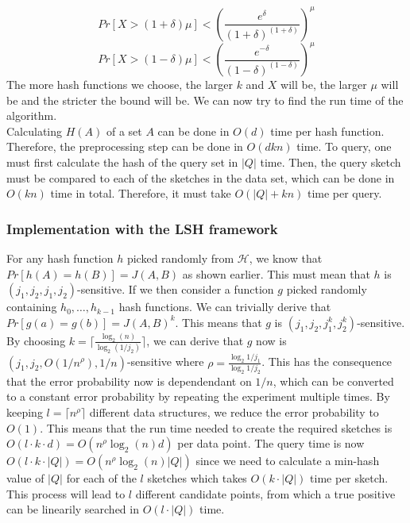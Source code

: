 $$Pr[X > (1+\delta)\mu] < \left(\frac{e^\delta}{(1+\delta)^{(1+\delta)}}\right)^\mu$$
$$Pr[X > (1-\delta)\mu] < \left(\frac{e^{-\delta}}{(1-\delta)^{(1-\delta)}}\right)^\mu$$
The more hash functions we choose, the larger $k$ and $X$ will be, the larger $\mu$ will be and the stricter the bound will be. We can now try to find the run time of the algorithm.\\
Calculating $H(A)$ of a set $A$ can be done in $O(d)$ time per hash function. Therefore, the preprocessing step can be done in $O(dkn)$ time. To query, one must first calculate the hash of the query set in $|Q|$ time. Then, the query sketch must be compared to each of the sketches in the data set, which can be done in $O(kn)$ time in total. Therefore, it must take $O(|Q| + kn)$ time per query.

\subsubsection{Implementation with the LSH framework}
For any hash function $h$ picked randomly from $\mathcal{H}$, we know that $Pr[h(A)=h(B)]=J(A,B)$ as shown earlier. This must mean that $h$ is $(j_1, j_2, j_1, j_2)$-sensitive. If we then consider a function $g$ picked randomly containing $h_0, \dots, h_{k-1}$ hash functions. We can trivially derive that $Pr[g(a)=g(b)]=J(A,B)^k$. This means that $g$ is $(j_1, j_2, j_1^k, j_2^k)$-sensitive. By choosing $k=\lceil \frac{\log_2(n)}{\log_2(1/j_2)} \rceil$, we can derive that $g$ now is $(j_1, j_2, O(1/n^\rho), 1/n)$-sensitive where $\rho=\frac{\log_2{1/j_1}}{\log_2{1/j_2}}$. %
This has the consequence that the error probability now is dependendant on $1/n$, which can be converted to a constant error probability by repeating the experiment multiple times. By keeping $l=\lceil n^\rho \rceil$ different data structures, we reduce the error probability to $O(1)$.
This means that the run time needed to create the required sketches is $O(l\cdot k \cdot d)=O(n^\rho \log_2(n)d)$ per data point. The query time is now $O(l\cdot k \cdot |Q|)=O(n^\rho \log_2(n)|Q|)$ since we need to calculate a min-hash value of $|Q|$ for each of the $l$ sketches which takes $O(k\cdot |Q|)$ time per sketch. This process will lead to $l$ different candidate points, from which a true positive can be linearily searched in $O(l\cdot |Q|)$ time.
